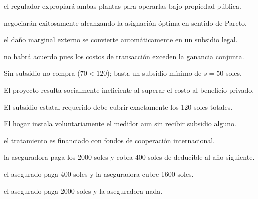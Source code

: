 \begin{opts}
    \item el regulador expropiará ambas plantas para operarlas bajo propiedad pública.
    \item negociarán exitosamente alcanzando la asignación óptima en sentido de Pareto.
    \item el daño marginal externo se convierte automáticamente en un subsidio legal.
    \item no habrá acuerdo pues los costos de transacción exceden la ganancia conjunta.
\end{opts}

\begin{opts}
    \item Sin subsidio no compra ($70 < 120$); basta un subsidio mínimo de $s = 50$ soles.
    \item El proyecto resulta socialmente ineficiente al superar el costo al beneficio privado.
    \item El subsidio estatal requerido debe cubrir exactamente los 120 soles totales.
    \item El hogar instala voluntariamente el medidor aun sin recibir subsidio alguno.
\end{opts}

\begin{opts}
    \item el tratamiento es financiado con fondos de cooperación internacional.
    \item la aseguradora paga los 2000 soles y cobra 400 soles de deducible al año siguiente.
    \item el asegurado paga 400 soles y la aseguradora cubre 1600 soles.
    \item el asegurado paga 2000 soles y la aseguradora nada.
\end{opts}

